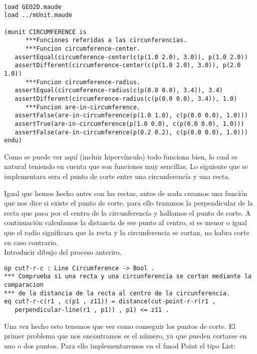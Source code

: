 \begin{verbatim}

load GEO2D.maude
load ../mUnit.maude

(munit CIRCUMFERENCE is 
      ***Funciones referidas a las circunferencias.
      ***Funcion circumference-center.
   assertEqual(circumference-center(c(p(1.0 2.0), 3.0)), p(1.0 2.0))
   assertDifferent(circumference-center(c(p(1.0 2.0), 3.0)), p(2.0 1.0))
      ***Funcion circumference-radius.
   assertEqual(circumference-radius(c(p(0.0 0.0), 3.4)), 3.4)
   assertDifferent(circumference-radius(c(p(0.0 0.0), 3.4)), 1.0)
      ***Funcion are-in-circumference.
   assertFalse(are-in-circumference(p(1.0 1.0), c(p(0.0 0.0), 1.0)))
   assertTrue(are-in-circumference(p(1.0 0.0), c(p(0.0 0.0), 1.0)))
   assertFalse(are-in-circumference(p(0.2 0.2), c(p(0.0 0.0), 1.0)))	
endu)
\end{verbatim}

Como se puede ver aqu\'i (incluir hiperv\'inculo) todo funciona bien, lo cual es natural teniendo en cuenta que son funciones muy sencillas. Lo siguiente que se implementara sera el punto de corte entre una circunferenc\'ia y una recta.

Igual que hemos hecho antes con las rectas, antes de nada creamos una funci\'on que nos dice si existe el punto de corte. para ello trazamos la perpendicular de la recta que pasa por el centro de la circunferenc\'ia y hallamos el punto de corte. A continuaci\'on calculamos la distancia de ese punto al centro, si es menor o igual que el radio significara que la recta y la circunferencia se cortan, no habra corte en caso contrario.\\

Introducir dibujo del proceso anteriro.\par
\begin{verbatim}
op cut?-r-c : Line Circumference -> Bool .
*** Comprueba si una recta y una circunferencia se cortan mediante la comparacion 
*** de la distancia de la recta al centro de la circunferencia.
eq cut?-r-c(r1 , c(p1 , z11)) = distance(cut-point-r-r(r1 , 
   perpendicular-line(r1 , p1)) , p1) <= z11 .
\end{verbatim}

Una vez hecho esto tenemos que ver como conseguir los puntos de corte. El primer problema que nos encontramos es el n\'umero, ya que pueden cortarse en uno o dos puntos. Para ello implementaremos en el fmod Point el tipo List:

